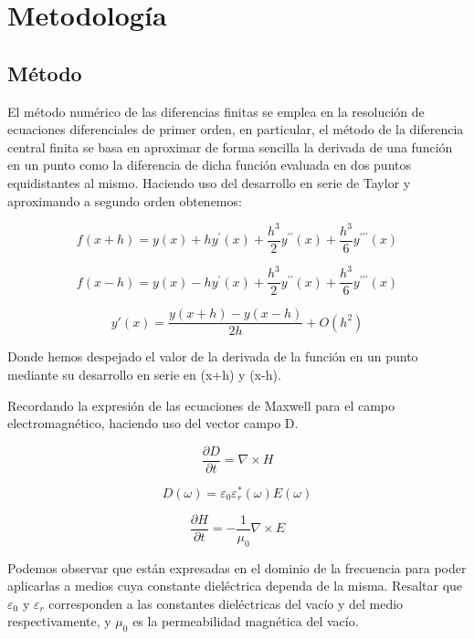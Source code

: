 \documentclass[11pt,a4paper,twoside,pdf]{article}
\numberwithin{equation}{section}
\begin{document}
\section{Metodología}
\subsection{Método}
El método numérico de las diferencias finitas se emplea en la resolución de ecuaciones diferenciales de primer orden, en particular, el método de la diferencia central finita se basa en aproximar de forma sencilla la derivada de una función en un punto como la diferencia de dicha función evaluada en dos puntos equidistantes al mismo. Haciendo uso del desarrollo en serie de Taylor y aproximando a segundo orden obtenemos:

\begin{equation}
f(x+h)=y(x)+hy^\prime(x)+\frac{h^3}{2}y^{\prime\prime}(x)+\frac{h^3}{6}y^{\prime\prime\prime}(x)
\end{equation}

\begin{equation}
f(x-h)=y(x)-hy^\prime(x)+\frac{h^3}{2}y^{\prime\prime}(x)+\frac{h^3}{6}y^{\prime\prime\prime}(x)
\end{equation}

\begin{equation}
y\prime(x)=\frac{y(x+h)-y(x-h)}{2h}+O(h^2)
\end{equation}

Donde hemos despejado el valor de la derivada de la función en un punto mediante su desarrollo en serie en (x+h) y (x-h).

Recordando la expresión de las ecuaciones de Maxwell para el campo electromagnético, haciendo uso del vector campo D.

\begin{equation}
\frac{\partial D}{\partial t}=\nabla \times H
\end{equation}

\begin{equation}
D(\omega)=\varepsilon_{0}\varepsilon^*_{r}(\omega)E(\omega)
\end{equation}

\begin{equation}
\frac{\partial H}{\partial t}=-\frac{1}{\mu_{0}}\nabla \times E
\end{equation}

Podemos observar que están expresadas en el dominio de la frecuencia para poder aplicarlas a medios cuya constante dieléctrica dependa de la misma. Resaltar que $\varepsilon_{0}$ y $\varepsilon_{r}$ corresponden a las constantes dieléctricas del vacío y del medio respectivamente, y $\mu_{0}$ es la permeabilidad magnética del vacío.
\end{document}
